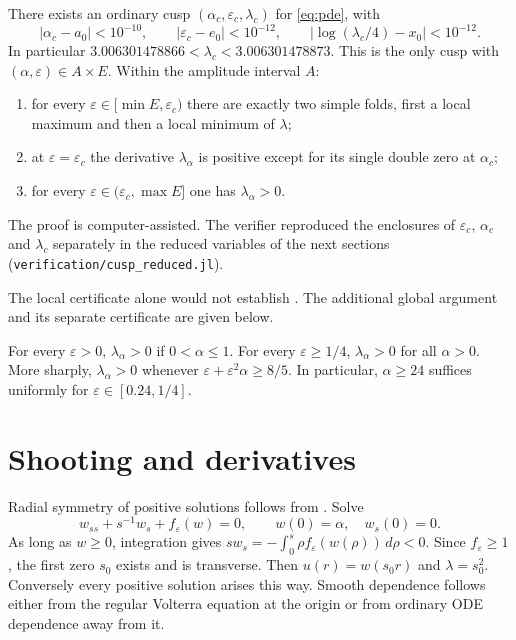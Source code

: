 \documentclass[11pt,a4paper]{report}
\begin{document}
\begin{theorem}\label{thm:local}
There exists an ordinary cusp $(\alpha_c,\varepsilon_c,\lambda_c)$ for
\eqref{eq:pde}, with
\begin{equation}\label{eq:box}
 |\alpha_c-a_0|<10^{-10},\qquad
 |\varepsilon_c-e_0|<10^{-12},\qquad
 \left|\log(\lambda_c/4)-x_0\right|<10^{-12}.
\end{equation}
In particular $3.006301478866<\lambda_c<3.006301478873$.
This is the only cusp with $(\alpha,\varepsilon)\in A\times E$.
Within the amplitude interval $A$:
\begin{enumerate}
\item for every $\varepsilon\in[\min E,\varepsilon_c)$ there are exactly two
simple folds, first a local maximum and then a local minimum of $\lambda$;
\item at $\varepsilon=\varepsilon_c$ the derivative $\lambda_\alpha$ is positive
except for its single double zero at $\alpha_c$;
\item for every $\varepsilon\in(\varepsilon_c,\max E]$ one has $\lambda_\alpha>0$.
\end{enumerate}
The proof is computer-assisted. The verifier reproduced the enclosures of
$\varepsilon_c$, $\alpha_c$ and $\lambda_c$ separately in the reduced variables
of the next sections (\texttt{verification/cusp\_reduced.jl}).
\end{theorem}

The local certificate alone would not establish .
The additional global argument and its separate certificate are given below.

\begin{theorem}\label{thm:tails}
For every $\varepsilon>0$, $\lambda_\alpha>0$ if $0<\alpha\leq1$.
For every $\varepsilon\geq1/4$, $\lambda_\alpha>0$ for all $\alpha>0$.
More sharply, $\lambda_\alpha>0$ whenever
$\varepsilon+\varepsilon^2\alpha\geq8/5$.
In particular, $\alpha\geq24$ suffices uniformly for
$\varepsilon\in[0.24,1/4]$.
\end{theorem}

\section{Shooting and derivatives}
Radial symmetry of positive solutions follows from
\autocite{GidasNiNirenberg1979}. Solve
\[
 w_{ss}+s^{-1}w_s+f_\varepsilon(w)=0,
 \qquad w(0)=\alpha,\quad w_s(0)=0.
\]
As long as $w\geq0$, integration gives $s w_s=-\int_0^s\rho f_\varepsilon(w(\rho))\,d\rho<0$.
Since $f_\varepsilon\geq1$, the first zero $s_0$ exists and is transverse.
Then $u(r)=w(s_0r)$ and $\lambda=s_0^2$. Conversely every positive solution
arises this way. Smooth dependence follows either from the regular Volterra
equation at the origin or from ordinary ODE dependence away from it.
\end{document}
